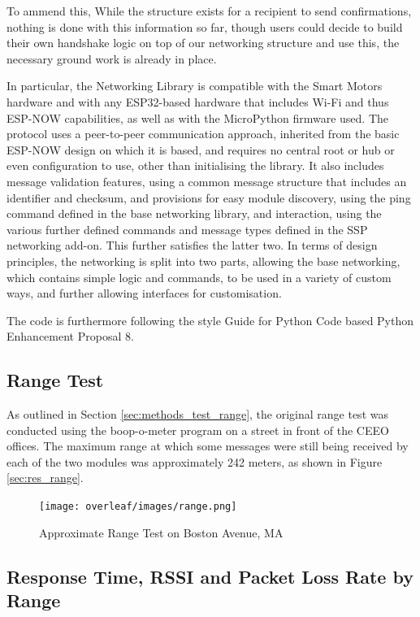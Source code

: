 To ammend this, 
While the structure exists for a recipient to send confirmations, nothing is done with this information so far, though users could decide to build their own handshake logic on top of our networking structure and use this, the necessary ground work is already in place.


In particular, the Networking Library is compatible with the Smart Motors hardware and with any ESP32-based hardware that includes Wi-Fi and thus ESP-NOW capabilities, as well as with the MicroPython firmware used. The protocol uses a peer-to-peer communication approach, inherited from the basic ESP-NOW design on which it is based, and requires no central root or hub or even configuration to use, other than initialising the library. It also includes message validation features, using a common message structure that includes an identifier and checksum, and provisions for easy module discovery, using the ping command defined in the base networking library, and interaction, using the various further defined commands and message types defined in the SSP networking add-on. This further satisfies the latter two. In terms of design principles, the networking is split into two parts, allowing the base networking, which contains simple logic and commands, to be used in a variety of custom ways, and further allowing interfaces for customisation. 

The code is furthermore following the style Guide for Python Code based Python Enhancement Proposal 8. \citep{rossum_python_2001}

\subsection{\label{sec:res_range}Range Test}

As outlined in Section \ref{sec:methods_test_range}, the original range test was conducted using the boop-o-meter program on a street in front of the CEEO offices. The maximum range at which some messages were still being received by each of the two modules was approximately 242 meters, as shown in Figure \ref{sec:res_range}.

\begin{figure}[H]
    \centering
    \texttt{[image: overleaf/images/range.png]}
    \vspace{\ftspace}
    \caption{Approximate Range Test on Boston Avenue, MA}
    \label{fig:range}
\end{figure}


\subsection{\label{sec:res_rssi}Response Time, RSSI and Packet Loss Rate by Range}

